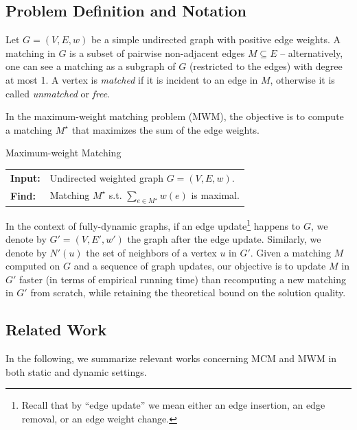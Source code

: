 \subsection{Problem Definition and Notation}
Let $G = (V, E, w)$ be a simple undirected graph with positive edge weights.
A matching in $G$ is a subset of pairwise non-adjacent edges $M \subseteq E$ --
alternatively, one can see a matching as a subgraph of $G$ (restricted to the
edges) with degree at most 1. A vertex is \emph{matched} if it is incident
to an edge in $M$, otherwise it is called \emph{unmatched} or \emph{free}.

In the maximum-weight matching problem (MWM), the objective is to compute
a matching $M^\star$  that maximizes the sum of the edge weights.

\begin{cproblem}{Maximum-weight Matching}
\begin{tabular}{ll}
\textbf{Input:} & Undirected weighted graph $G = (V, E, w)$.\\
\textbf{Find:} & Matching $M^\star$ s.t. $\sum_{e \in M^\star}w(e)$ is maximal.
\end{tabular}
\end{cproblem}

In the context of fully-dynamic graphs, if an edge update\footnote{Recall that
by \enquote{edge update} we mean either an edge insertion, an edge removal, or
an edge weight change.} happens to $G$, we denote by $G' = (V, E', w')$ the
graph after the edge update. Similarly, we denote by $N'(u)$ the set of
neighbors of a vertex $u$ in $G'$. Given a matching $M$ computed on $G$ and a
sequence of graph updates, our objective is to update $M$ in $G'$ faster (in
terms of empirical running time) than recomputing a new matching in $G'$ from
scratch, while retaining the theoretical bound on the solution quality.

\subsection{Related Work}
\label{sec:dyn-mwm:related-work}

In the following, we summarize relevant works concerning MCM and MWM in both
static and dynamic settings.


